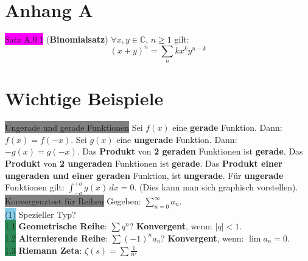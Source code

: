 \documentclass[landscape, 10pt]{article}
\newcommand{\C}{\mathbb{C}}
\begin{document}
\begin{multicols}{3}
\section{Anhang A}
              \colorbox{magenta}{Satz A.0.1} 
              (\textbf{Binomialsatz}) 
                     \textcolor{NavyBlue}{
                     $\forall x,y\in\C,\,n\geqslant1$} gilt:
                     \begin{equation*}
                            (x+y)^n=\sum_{n}{k}x^ky^{n-k}
                     \end{equation*}


\section{Wichtige Beispiele}
       \colorbox{gray}{Ungerade und gerade Funktionen} Sei \textcolor{NavyBlue}{$f(x)$}
              eine \textbf{gerade} Funktion. Dann: \textcolor{NavyBlue}{$f(x)=f(-x)$}.
              Sei \textcolor{NavyBlue}{$g(x)$} eine \textbf{ungerade} 
              Funktion. Dann: \textcolor{NavyBlue}{$-g(x)=g(-x)$}.
              Das \textbf{Produkt} von \textbf{2 geraden} Funktionen 
              ist \textbf{gerade}. Das \textbf{Produkt} von \textbf{2 
              ungeraden}
              Funktionen ist \textbf{gerade}. Das \textbf{Produkt einer 
              ungeraden und einer geraden} Funktion,
              ist \textbf{ungerade}.
              Für \textbf{ungerade} Funktionen gilt:
              \textcolor{NavyBlue}{$\int_{-a}^{+a}g(x)\,dx=0$}. (Dies kann man sich
              graphisch vorstellen).\\
       \colorbox{gray}{Konvergenztest für Reihen}
              Gegeben: \textcolor{NavyBlue}{$\sum_{n=0}^\infty a_n$}.\\
       \colorbox{SkyBlue}{(1)} Spezieller Typ?\\
              \colorbox{SeaGreen}{1.1} \textbf{Geometrische Reihe}: 
                     \textcolor{NavyBlue}{$\sum q^n$}? 
                     \textbf{Konvergent}, 
                     wenn: \textcolor{NavyBlue}{$|q|<1$}.\\
              \colorbox{SeaGreen}{1.2} \textbf{Alternierende Reihe}: 
                     \textcolor{NavyBlue}{$\sum(-1)^na_n$}? 
                     \textbf{Konvergent}, wenn:
                     \textcolor{NavyBlue}{$\lim a_n=0$}.\\
              \colorbox{SeaGreen}{1.3} \textbf{Riemann Zeta}: 
                     \textcolor{NavyBlue}{$\zeta(s)=\sum\frac{1}{n^s}$} 

\end{multicols}
\end{document}
